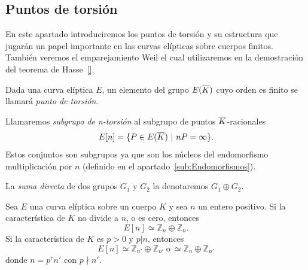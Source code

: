 \subsection{Puntos de torsión}
\label{sub:Puntos de torsión}

En este apartado introduciremos los puntos de torsión y su estructura que jugarán un papel importante en las curvas elípticas sobre cuerpos finitos. También veremos el emparejamiento Weil el cual utilizaremos en la demostración del teorema de Hasse~\ref{}.

\begin{definicion}
	Dada una curva elíptica $E$, un elemento del grupo $E(\overline{K})$ cuyo orden es finito se llamará \emph{punto de torsión}.
\end{definicion}

\begin{definicion}
	Llamaremos \emph{subgrupo de n-torsión} al subgrupo de puntos $\overline{K}$-racionales
	$$
		E[n] = \{ P \in E(\overline{K}) \ | \  n P = \infty \}.
	$$
	Estos conjuntos son subgrupos ya que son los núcleos del endomorfismo multiplicación por $n$ (definido en el apartado~\ref{sub:Endomorfismos}).
\end{definicion}

%

La \emph{suma directa} de dos grupos $G_1$ y $G_2$ la denotaremos $G_1 \oplus G_2$.

\begin{teorema}\label{th:estructura subgrupos torsión}
	Sea $E$ una curva elíptica sobre un cuerpo $K$ y sea $n$ un entero positivo. Si la característica de $K$ no divide a $n$, o es cero, entonces
	$$
		E[n] \simeq \mathbb{Z}_n \oplus \mathbb{Z}_n.
	$$
	Si la característica de $K$ es $p > 0$ y $p | n$, entonces
	$$
		E[n] \simeq \mathbb{Z}_{n'} \oplus \mathbb{Z}_{n'} \ \textrm{o} \ \simeq \mathbb{Z}_{n} \oplus \mathbb{Z}_{n'}
	$$
	donde $n = p^r n'$ con $p \nmid n'$.
\end{teorema}

